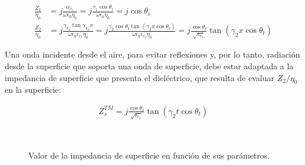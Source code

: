 \begin{align}
	\frac{Z_{1}}{\eta_0} &= j\frac{\alpha_{x_1}}{\omega \epsilon_0 \eta_0} = j\frac{\gamma_1 \cos\theta_i}{\omega \epsilon_0 \eta_0} = j\cos \theta_i \\
	\frac{Z_{2}}{\eta_0} &= j\frac{\gamma_{x_2} \tan \gamma_{x_2} x}{\omega \epsilon_0 \epsilon_{r_2} \eta_0} = j\frac{\gamma_2 \cos\theta_t \tan(\gamma_2 x \cos\theta_t)}{\omega \epsilon_0 \epsilon_{r_2} \eta_0} = j \frac{\cos \theta_t}{\sqrt{\epsilon_{r_2}}}\tan(\gamma_2 x \cos\theta_t)
\end{align}

Una onda incidente desde el aire, para evitar reflexiones y, por lo tanto, radiación desde la superficie que soporta una onda de superficie, debe estar adaptada a la impedancia de superficie que presenta el dieléctrico, que resulta de evaluar $Z_2/\eta_0$ en la superficie:

\begin{align}
	\label{eq:impedancia-superficie-tm-teorica}
	Z_s^{TM} = j \frac{\cos \theta_t}{\sqrt{\epsilon_{r_2}}}\tan(\gamma_2 t \cos\theta_t)
\end{align}


\begin{figure} [H]
	\centering 
	\hspace{5mm}
	\\
	
	\caption{Valor de la impedancia de superficie en función de sus parámetros.}
	\label{fig:Zstm-parametros}
\end{figure}


